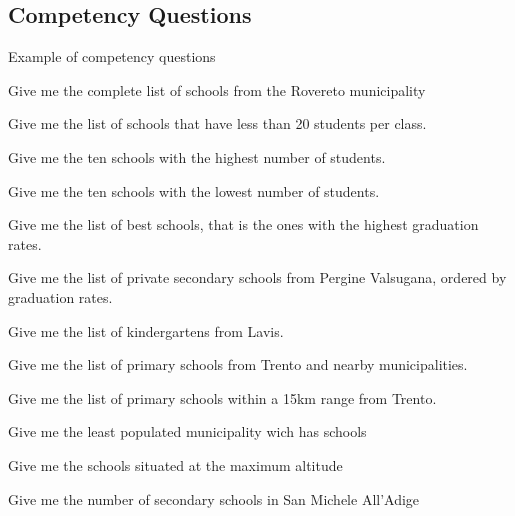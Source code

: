 \subsection{Competency Questions}
Example of competency questions

Give me the complete list of schools from the Rovereto municipality

Give me the list of schools that have less than 20 students per class.

Give me the ten schools with the highest number of students.

Give me the ten schools with the lowest number of students.

Give me the list of best schools, that is the ones with the highest graduation rates.

Give me the list of private secondary schools from Pergine Valsugana, ordered by graduation rates.

Give me the list of kindergartens from Lavis.

Give me the list of primary schools from Trento and nearby municipalities.

Give me the list of primary schools within a 15km range from Trento.

Give me the least populated municipality wich has schools

Give me the schools situated at the maximum altitude

Give me the number of secondary schools in San Michele All'Adige
